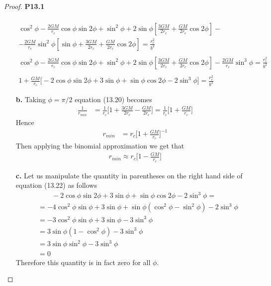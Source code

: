 \documentclass[11pt]{article}
\theoremstyle{definition}
\begin{document}
\begin{proof}{\textbf{P13.1}}
\begin{itemize}
\begin{align*}
    \\
    \cos^2\phi - \frac{2GM}{r_c}\cos\phi\sin 2\phi
    + \sin^2\phi + 2\sin\phi\left[\frac{3GM}{2r_c} + \frac{GM}{2r_c}\cos 2\phi\right] -\\
    - \frac{2GM}{r_c}\sin^2\phi
    \left[\sin\phi + \frac{3GM}{2r_c} + \frac{GM}{2r_c}\cos 2\phi\right]
    = \frac{r_c^2}{b^2}\\
    \\
    \cos^2\phi - \frac{2GM}{r_c}\cos\phi\sin 2\phi
    + \sin^2\phi + 2\sin\phi\left[\frac{3GM}{2r_c} + \frac{GM}{2r_c}\cos 2\phi\right]
    - \frac{2GM}{r_c}\sin^3\phi = \frac{r_c^2}{b^2}\\
    \\
    1 + \frac{GM}{r_c}\bigg[- 2\cos\phi\sin 2\phi + 3\sin\phi
    + \sin\phi\cos 2\phi - 2\sin^3\phi\bigg] = \frac{r_c^2}{b^2}
\end{align*}
\cleardoublepage
\item [\textbf{b.}] Taking $\phi = \pi/2$ equation (13.20) becomes
\begin{align*}
    \frac{1}{r_{min}}
    &= \frac{1}{r_c}\bigg[1 + \frac{3GM}{2r_c} - \frac{GM}{2r_c}\bigg]
    = \frac{1}{r_c}\bigg[1 + \frac{GM}{r_c}\bigg]
\end{align*}
Hence 
\begin{align*}
    r_{min}
    &= r_c\bigg[1 + \frac{GM}{r_c}\bigg]^{-1}
\end{align*}
Then applying the binomial approximation we get that
\begin{align*}
    r_{min} \approx r_c\bigg[1 - \frac{GM}{r_c}\bigg]
\end{align*}
\item [\textbf{c.}] Let us manipulate the quantity in parentheses on the right
hand side of equation (13.22) as follows
\begin{align*}
    &\qquad - 2\cos\phi\sin 2\phi + 3\sin\phi + \sin\phi\cos 2\phi - 2\sin^3\phi = \\
    &= - 4\cos^2\phi\sin\phi + 3\sin\phi + \sin\phi(\cos^2\phi - \sin^2\phi)- 2\sin^3\phi\\
    &= - 3\cos^2\phi\sin\phi + 3\sin\phi - 3\sin^3\phi\\
    &= 3\sin\phi(1 - \cos^2\phi) - 3\sin^3\phi\\
    &= 3\sin\phi\sin^2\phi - 3\sin^3\phi\\
    &= 0
\end{align*}
Therefore this quantity is in fact zero for all $\phi$.
\end{itemize}
\end{proof}
\end{document}
